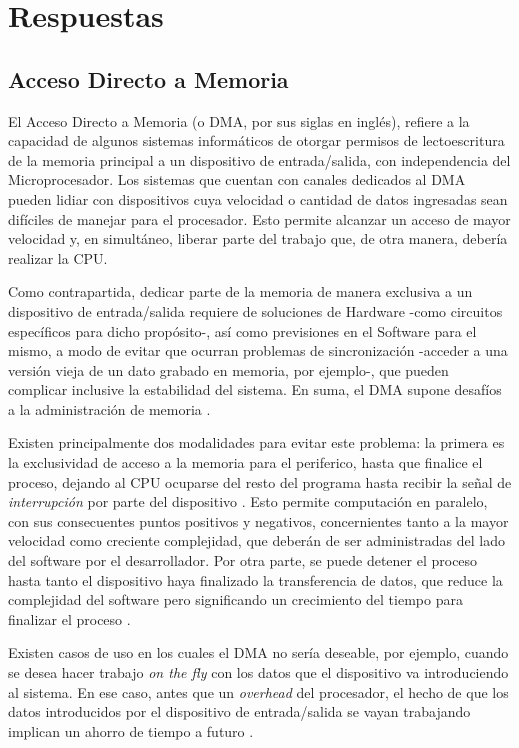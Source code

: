 \documentclass[12pt]{article}
\begin{document}
\pagebreak

\section{Respuestas}

\subsection{Acceso Directo a Memoria}

El Acceso Directo a Memoria (o DMA, por sus siglas en inglés),
refiere a la capacidad de algunos sistemas informáticos de
otorgar permisos de lectoescritura de la memoria principal
a un dispositivo de entrada/salida,
con independencia del Microprocesador.
Los sistemas que cuentan con canales dedicados al DMA pueden lidiar con
dispositivos cuya velocidad o cantidad de datos ingresadas sean difíciles de
manejar para el procesador.
Esto permite alcanzar un acceso de mayor velocidad y,
en simultáneo, liberar parte del trabajo que,
de otra manera,
debería realizar la CPU\parencite{directmemoryaccess}.

Como contrapartida,
dedicar parte de la memoria de manera exclusiva a un dispositivo de entrada/salida
requiere de soluciones de Hardware -como circuitos específicos para dicho propósito-,
así como previsiones en el Software para el mismo,
a modo de evitar que ocurran problemas de sincronización
-acceder a una versión vieja de un dato grabado en memoria, por ejemplo-,
que pueden complicar inclusive la estabilidad del sistema.
En suma, el DMA supone desafíos a la administración de memoria \parencite{corbetetal2005linux}.

Existen principalmente dos modalidades para evitar este problema: la primera es
la exclusividad de acceso a la memoria para el periferico, hasta que finalice el
proceso, dejando al CPU ocuparse del resto del programa hasta recibir la señal
de \textit{interrupción} por parte del dispositivo \parencite{harvey1991dmafundamentals}.
Esto permite computación en paralelo,
con sus consecuentes puntos positivos y negativos,
concernientes tanto a la mayor velocidad como creciente complejidad,
que deberán de ser administradas del lado del software por el desarrollador.
Por otra parte, se puede detener el proceso hasta tanto
el dispositivo haya finalizado la transferencia de datos,
que reduce la complejidad del software
pero significando un crecimiento del tiempo para finalizar el proceso
\parencite{santamaria1993electronica}.

Existen casos de uso en los cuales el DMA no sería deseable, por ejemplo,
cuando se desea hacer trabajo \textit{on the fly} con los datos que el dispositivo
va introduciendo al sistema. En ese caso, antes que un \textit{overhead} del procesador,
el hecho de que los datos introducidos por el dispositivo de entrada/salida se vayan
trabajando implican un ahorro de tiempo a futuro \parencite{harvey1991dmafundamentals}.
\end{document}

